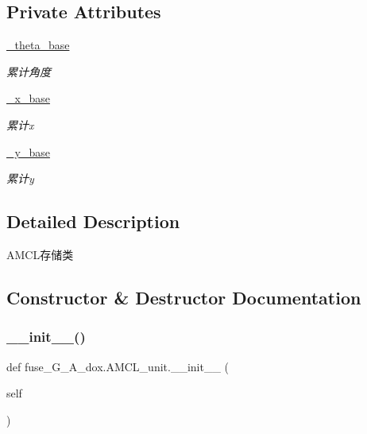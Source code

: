 \subsection*{Private Attributes}
\begin{DoxyCompactItemize}
\item 
\hyperlink{classfuse___g___a__dox_1_1_a_m_c_l__unit_a5e1603e18370bdc4754d2473afd5181a}{\+\_\+theta\+\_\+base}
\begin{DoxyCompactList}\small\item\em 累计角度 \end{DoxyCompactList}\item 
\hyperlink{classfuse___g___a__dox_1_1_a_m_c_l__unit_adfdefe6d8f319ecd808365cb3bea0750}{\+\_\+x\+\_\+base}
\begin{DoxyCompactList}\small\item\em 累计x \end{DoxyCompactList}\item 
\hyperlink{classfuse___g___a__dox_1_1_a_m_c_l__unit_aa2c92461b2d502a9f5bd2666fa23cfe5}{\+\_\+y\+\_\+base}
\begin{DoxyCompactList}\small\item\em 累计y \end{DoxyCompactList}\end{DoxyCompactItemize}


\subsection{Detailed Description}
A\+M\+C\+L存储类 



\subsection{Constructor \& Destructor Documentation}
\mbox{\label{classfuse___g___a__dox_1_1_a_m_c_l__unit_ac997c63c12d51affaf29aea632ee25e1}} 
\subsubsection{\texorpdfstring{\+\_\+\+\_\+init\+\_\+\+\_\+()}{\_\_init\_\_()}}
{\footnotesize\ttfamily def fuse\+\_\+\+G\+\_\+\+A\+\_\+dox.\+A\+M\+C\+L\+\_\+unit.\+\_\+\+\_\+init\+\_\+\+\_\+ (\begin{DoxyParamCaption}\item[{}]{self }\end{DoxyParamCaption})}



